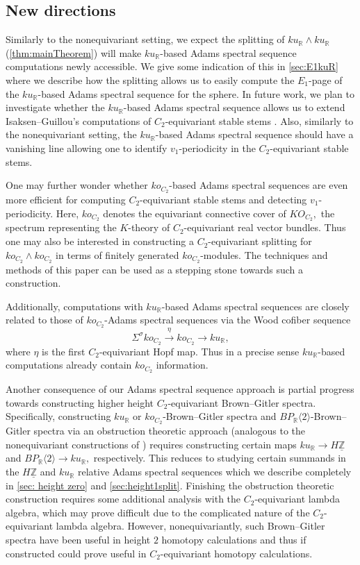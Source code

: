 \documentclass{amsart}
\theoremstyle{plain}
\numberwithin{equation}{section}
\numberwithin{figure}{section}
\newcommand{\mR}{{\mathbb R}}
\newcommand{\mZ}{{\mathbb Z}}
\newcommand{\umZ}{\underline{\mZ}}
\newcommand{\0}{\langle 0 \rangle }
\begin{document}
\subsection{New directions}
Similarly to the nonequivariant setting, we expect the splitting of $ku_\mR \wedge ku_\mR$ (\cref{thm:mainTheorem}) will make $ku_\mR$-based Adams spectral sequence computations newly accessible. We give some indication of this in \cref{sec:E1kuR} where we describe how the splitting allows us to easily compute the $E_1$-page of the $ku_{\mR}$-based Adams spectral sequence for the sphere. In future work, we plan to investigate whether the $ku_\mR$-based Adams spectral sequence allows us to extend Isaksen--Guillou's computations of $C_2$-equivariant stable stems \cite{GuillouIsaksen24}. Also, similarly to the nonequivariant setting, the $ku_\mR$-based Adams spectral sequence should have a vanishing line allowing one to identify $v_1$-periodicity in the $C_2$-equivariant stable stems. 

One may further wonder whether $ko_{C_2}$-based Adams spectral sequences are even more efficient for computing $C_2$-equivariant stable stems and detecting $v_1$-periodicity. Here, $ko_{C_2}$ denotes the equivariant connective cover of $KO_{C_{2}},$ the spectrum representing the $K$-theory of $C_{2}$-equivariant real vector bundles. Thus one may also be interested in constructing a $C_2$-equivariant splitting for $ko_{C_2} \wedge ko_{C_2}$ in terms of finitely generated $ko_{C_2}$-modules. The techniques and methods of this paper can be used as a stepping stone towards such a construction. 

Additionally, computations with $ku_\mR$-based Adams spectral sequences are closely related to those of $ko_{C_2}$-Adams spectral sequences via the Wood cofiber sequence 
\[
\Sigma^\sigma ko_{C_2} \xrightarrow{\eta} ko_{C_2} \to ku_{\mR},
\]
where $\eta$ is the first $C_2$-equivariant Hopf map. Thus in a precise sense $ku_\mR$-based computations already contain $ko_{C_2}$ information.

Another consequence of our Adams spectral sequence approach is partial progress towards constructing higher height $C_2$-equivariant Brown--Gitler spectra. Specifically, constructing $ku_\mR$ or $ko_{C_2}$-Brown--Gitler spectra and $BP_\mR \langle 2 \rangle$-Brown--Gitler spectra via an obstruction theoretic approach (analogous to the nonequivariant constructions of \cite{goerss1986some,klippenstein1988brown}) requires constructing certain maps $ku_\mR \to H \umZ$ and $BP_\mR \langle 2 \rangle \to ku_\mR,$ respectively. This reduces to studying certain summands in the $H \umZ$ and $ku_\mR$ relative Adams spectral sequences which we describe completely in \cref{sec: height zero} and \cref{sec:height1split}. Finishing the obstruction theoretic construction requires some additional analysis with the $C_2$-equivariant lambda algebra, which may prove difficult due to the complicated nature of the $C_2$-equivariant lambda algebra. However, nonequivariantly, such Brown--Gitler spectra have been useful in height $2$ homotopy calculations \cite{BOSS19} and thus if constructed could prove useful in $C_2$-equivariant homotopy calculations. 
\end{document}
